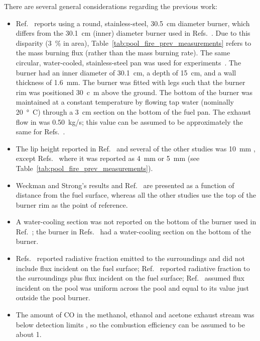 \documentclass[12pt]{article}
\begin{document}
There are several general considerations regarding the previous work:
\begin{itemize}
\item Ref.~\cite{Weckman1996} reports using a round, stainless-steel, 30.5~cm diameter burner, which differs from the 30.1~cm (inner) diameter burner used in Refs.~\cite{Kim2019,Hamins1994,Klassen1994,Hamins1991,Hamins2016,Wang2019,Buch1997}. Due to this disparity (3~\% in area), Table~\ref{tab:pool_fire_prev_measurements} refers to the mass burning flux (rather than the mass burning rate). The same circular, water-cooled, stainless-steel pan was used for experiments~\cite{Kim2019,Hamins1994,Klassen1994,Hamins1991,Hamins2016,Wang2019,Buch1997}. The burner had an inner diameter of 30.1~cm, a depth of 15~cm, and a wall thickness of 1.6~mm. The burner was fitted with legs such that the burner rim was positioned 30~c~m above the ground. The bottom of the burner was maintained at a constant temperature by flowing tap water (nominally 20~\si{\degree C}) through a 3~cm section on the bottom of the fuel pan. The exhaust flow in \cite{Kim2019} was 0.50~kg/s; this value can be assumed to be approximately the same for Refs.~\cite{Hamins1994,Klassen1994,Hamins2016,Wang2019,Buch1997}.
\item The lip height reported in Ref.~\cite{Weckman1996} and several of the other studies was 10~mm \cite{Hamins2016,Wang2019}, except Refs.~\cite{Hamins1994,Klassen1994,Hamins1991,Hamins2016,Buch1997} where it was reported as 4~mm or 5~mm (see Table~\ref{tab:pool_fire_prev_measurements}).
\item Weckman and Strong’s results \cite{Weckman1996} and Ref.~\cite{Hamins2016} are presented as a function of distance from the fuel surface, whereas all the other studies use the top of the burner rim as the point of reference.
\item A water-cooling section was not reported on the bottom of the burner used in Ref.~\cite{Weckman1996}; the burner in Refs.~\cite{Kim2019,Klassen1994,Hamins1991,Hamins1994,Hamins2016,Wang2019,Buch1997} had a water-cooling section on the bottom of the burner.
\item Refs.~\cite{Kim2019,Buch1997} reported radiative fraction emitted to the surroundings and did not include flux incident on the fuel surface; Ref.~\cite{Kim2019} reported radiative fraction to the surroundings plus flux incident on the fuel surface; Ref.~\cite{Klassen1994} assumed flux incident on the pool was uniform across the pool and equal to its value just outside the pool burner.
\item The amount of CO in the methanol, ethanol and acetone exhaust stream was below detection limits \cite{Kim2019}, so the combustion efficiency can be assumed to be about 1.

\end{itemize}
\end{document}
